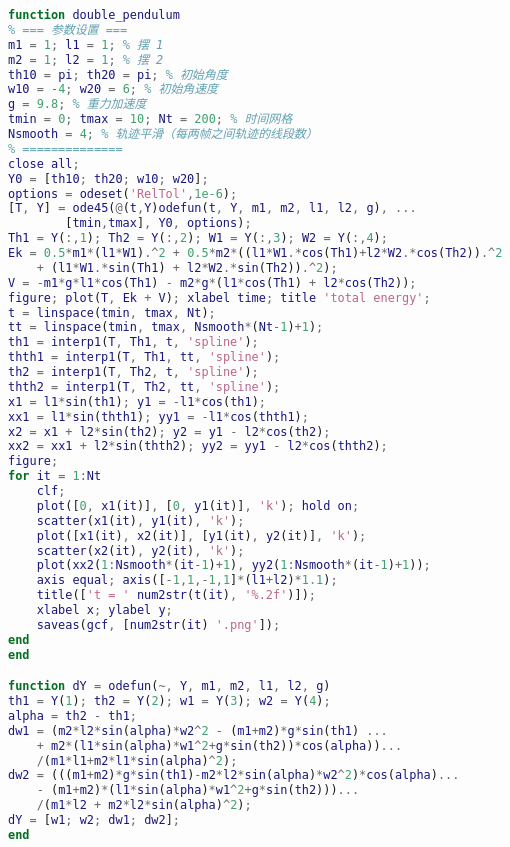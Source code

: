 \begin{lstlisting}[language=matlab, caption=double_pendulum.m]
% 双摆运动
function double_pendulum
% === 参数设置 ===
m1 = 1; l1 = 1; % 摆 1
m2 = 1; l2 = 1; % 摆 2
th10 = pi; th20 = pi; % 初始角度
w10 = -4; w20 = 6; % 初始角速度
g = 9.8; % 重力加速度
tmin = 0; tmax = 10; Nt = 200; % 时间网格
Nsmooth = 4; % 轨迹平滑（每两帧之间轨迹的线段数）
% ==============
close all;
Y0 = [th10; th20; w10; w20];
options = odeset('RelTol',1e-6);
[T, Y] = ode45(@(t,Y)odefun(t, Y, m1, m2, l1, l2, g), ...
        [tmin,tmax], Y0, options);
Th1 = Y(:,1); Th2 = Y(:,2); W1 = Y(:,3); W2 = Y(:,4);
Ek = 0.5*m1*(l1*W1).^2 + 0.5*m2*((l1*W1.*cos(Th1)+l2*W2.*cos(Th2)).^2 ...
    + (l1*W1.*sin(Th1) + l2*W2.*sin(Th2)).^2);
V = -m1*g*l1*cos(Th1) - m2*g*(l1*cos(Th1) + l2*cos(Th2));
figure; plot(T, Ek + V); xlabel time; title 'total energy';
t = linspace(tmin, tmax, Nt);
tt = linspace(tmin, tmax, Nsmooth*(Nt-1)+1);
th1 = interp1(T, Th1, t, 'spline');
thth1 = interp1(T, Th1, tt, 'spline');
th2 = interp1(T, Th2, t, 'spline');
thth2 = interp1(T, Th2, tt, 'spline');
x1 = l1*sin(th1); y1 = -l1*cos(th1);
xx1 = l1*sin(thth1); yy1 = -l1*cos(thth1);
x2 = x1 + l2*sin(th2); y2 = y1 - l2*cos(th2);
xx2 = xx1 + l2*sin(thth2); yy2 = yy1 - l2*cos(thth2);
figure;
for it = 1:Nt
    clf;
    plot([0, x1(it)], [0, y1(it)], 'k'); hold on;
    scatter(x1(it), y1(it), 'k');
    plot([x1(it), x2(it)], [y1(it), y2(it)], 'k');
    scatter(x2(it), y2(it), 'k');
    plot(xx2(1:Nsmooth*(it-1)+1), yy2(1:Nsmooth*(it-1)+1));
    axis equal; axis([-1,1,-1,1]*(l1+l2)*1.1);
    title(['t = ' num2str(t(it), '%.2f')]);
    xlabel x; ylabel y;
    saveas(gcf, [num2str(it) '.png']);
end
end

function dY = odefun(~, Y, m1, m2, l1, l2, g)
th1 = Y(1); th2 = Y(2); w1 = Y(3); w2 = Y(4);
alpha = th2 - th1;
dw1 = (m2*l2*sin(alpha)*w2^2 - (m1+m2)*g*sin(th1) ...
    + m2*(l1*sin(alpha)*w1^2+g*sin(th2))*cos(alpha))...
    /(m1*l1+m2*l1*sin(alpha)^2);
dw2 = (((m1+m2)*g*sin(th1)-m2*l2*sin(alpha)*w2^2)*cos(alpha)...
    - (m1+m2)*(l1*sin(alpha)*w1^2+g*sin(th2)))...
    /(m1*l2 + m2*l2*sin(alpha)^2);
dY = [w1; w2; dw1; dw2];
end
\end{lstlisting}

